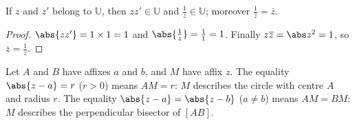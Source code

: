 \begin{theorem}
If $z$ and $z'$ belong to $\mathbb U$, then $zz'\in\mathbb U$ and $\frac1z\in\mathbb U$; moreover $\frac1z=\overline z$.
\end{theorem}
\begin{proof}
$\abs{zz'}=1\times1=1$ and $\abs{\frac1z}=\frac11=1$. Finally $z\overline z=\abs z^2=1$, so $\overline z=\frac1z$.
\end{proof}
\begin{method}
Let $A$ and $B$ have affixes $a$ and $b$, and $M$ have affix $z$. The equality $\abs{z-a}=r$ ($r>0$) means $AM=r$: $M$ describes the circle with centre $A$ and radius $r$. The equality $\abs{z-a}=\abs{z-b}$ ($a\neq b$) means $AM=BM$: $M$ describes the perpendicular bisector of $[AB]$.
\end{method}

